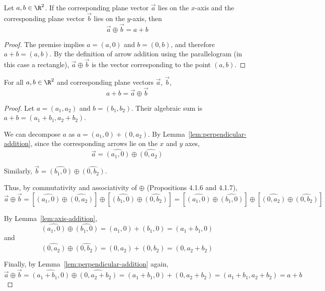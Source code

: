 \begin{lemma}\label{lem:perpendicular-addition}
    Let $a, b \in \R^2$. If the corresponding plane vector $\vec{a}$ lies on the $x$-axis and the corresponding plane vector $\vec{b}$ lies on the $y$-axis, then
    \[
    \vec{a} \oplus \vec{b} = a + b
    \]
\end{lemma}

\begin{proof}
    The premise implies $a = (a, 0)$ and $b = (0, b)$, and therefore $a + b = (a, b)$. By the definition of arrow addition using the parallelogram (in this case a rectangle), $\vec{a} \oplus \vec{b}$ is the vector corresponding to the point $(a, b)$.
\end{proof}
\newpage
\begin{proposition}\label{prop:addition-equivalence}
    For all $a, b \in \R^2$ and corresponding plane vectors $\vec{a}$, $\vec{b}$,
    \[
    a + b = \vec{a} \oplus \vec{b}
    \]
\end{proposition}

\begin{proof}
    Let $a = (a_1, a_2)$ and $b = (b_1, b_2)$. Their algebraic sum is $a + b = (a_1 + b_1, a_2 + b_2)$.
    
    We can decompose $a$ as $a = (a_1, 0) + (0, a_2)$. By Lemma~\ref{lem:perpendicular-addition}, since the corresponding arrows lie on the $x$ and $y$ axes,
    \[
    \vec{a} = \widehat{(a_1, 0)} \oplus \widehat{(0, a_2)}
    \]
    
    Similarly, $\vec{b} = \widehat{(b_1, 0)} \oplus \widehat{(0, b_2)}$.
    
    Thus, by commutativity and associativity of $\oplus$ (Propositions 4.1.6 and 4.1.7),
    \[
    \vec{a} \oplus \vec{b} = \left[\widehat{(a_1, 0)} \oplus \widehat{(0, a_2)}\right] \oplus \left[\widehat{(b_1, 0)} \oplus \widehat{(0, b_2)}\right] = \left[\widehat{(a_1, 0)} \oplus \widehat{(b_1, 0)}\right] \oplus \left[\widehat{(0, a_2)} \oplus \widehat{(0, b_2)}\right]
    \]
    
    By Lemma~\ref{lem:axis-addition},
    \[
    \widehat{(a_1, 0)} \oplus \widehat{(b_1, 0)} = (a_1, 0) + (b_1, 0) = (a_1 + b_1, 0)
    \]
    and
    \[
    \widehat{(0, a_2)} \oplus \widehat{(0, b_2)} = (0, a_2) + (0, b_2) = (0, a_2 + b_2)
    \]
    
    Finally, by Lemma~\ref{lem:perpendicular-addition} again,
    \[
    \vec{a} \oplus \vec{b} = \widehat{(a_1 + b_1, 0)} \oplus \widehat{(0, a_2 + b_2)} = (a_1 + b_1, 0) + (0, a_2 + b_2) = (a_1 + b_1, a_2 + b_2) = a + b
    \]
\end{proof}

